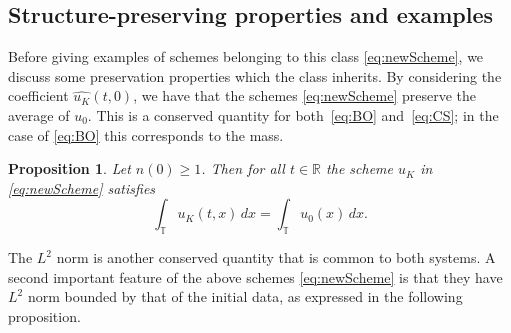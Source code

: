\documentclass [11pt] {article}
\newtheorem{prop}[thm]{Proposition}
\newcommand{\<}{\langle}
\renewcommand{\>}{\rangle}
\begin{document}
\subsection{Structure-preserving properties and examples}\label{sec:struc}
Before giving examples of schemes belonging to this class \eqref{eq:newScheme}, we discuss some preservation properties which the class inherits.
By considering the coefficient $\widehat{u_{K}}(t,0)$, we have that the schemes \eqref{eq:newScheme} preserve the average of $u_0$.  This is a conserved quantity for both~\eqref{eq:BO} and~\eqref{eq:CS}; in the case of \eqref{eq:BO} this corresponds to the  mass.
\begin{prop}\label{prop:average}
Let $n(0)\geq 1$.  Then for all $t\in \mathbb{R}$ the scheme $u_K$ in \eqref{eq:newScheme} satisfies
\[\int_{\mathbb{T}} u_K(t,x)\,dx = \int_{\mathbb{T}} u_0(x)\,dx.\]
\end{prop}

The $L^2$ norm is another conserved quantity that is common to both systems.
A second important feature of the above schemes \eqref{eq:newScheme} is that they have $L^2$ norm bounded by that of the initial data, as expressed in the following proposition.
\end{document}
